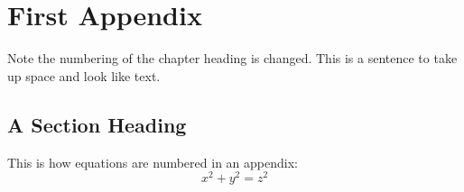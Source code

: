 \chapter{First Appendix}
Note the numbering of the chapter heading is changed.
This is a sentence to take up space and look like text.
\section{A Section Heading}
This is how equations are numbered in an appendix:
\begin{equation}
x^2 + y^2 = z^2
\end{equation} 